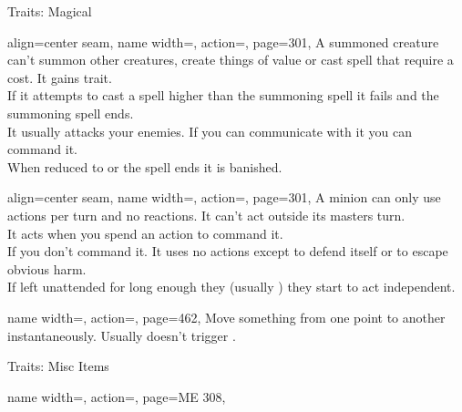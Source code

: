 \begin{PageFrontLandscape}
\begin{TablesHalf}{\frontTableHeight}
\begin{Table}{Traits: Magical}
            \begin{entry}{}{%
                align=center seam,
                name width=\conditionLength,%
                action=\Summoned,
                page=301,
            }
                A summoned creature can't summon other creatures, create things of value or cast spell that require a cost.
                It gains \Minion trait.\\
                If it attempts to cast a spell higher than the summoning spell it fails and the summoning spell ends. \\
                It usually attacks your enemies. If you can communicate with it you can command it.\hfill
                \\
                When reduced to  \HPs or the spell ends it is banished. \hfill
                 \hfill
            \end{entry}
            \begin{entry}{}{%
                align=center seam,
                name width=\conditionLength,%
                action=\Minion,
                page=301,
            }
                A minion can only use  actions per turn and no reactions.
                It can't act outside its masters turn.\\
                It acts when you spend an action to command it.
                \\
                If you don't command it.
                It uses no actions except to defend itself or to escape obvious harm.\\
                If left unattended for long enough they (usually ) they start to act independent.
            \end{entry}
            \begin{entry}{}{%
                name width=\conditionLength,%
                action=\Teleportation,
                page=462,
            }
                Move something from one point to another instantaneously.
                Usually doesn't trigger .
            \end{entry}
        \end{Table}\TableSpace
        \begin{Table}{Traits: Misc Items}
            \begin{entry}{}{%
                name width=\conditionLength,%
                action=\Adjustment,
                page=ME 308,
            }

\end{entry}
\end{Table}
\end{TablesHalf}
\end{PageFrontLandscape}
